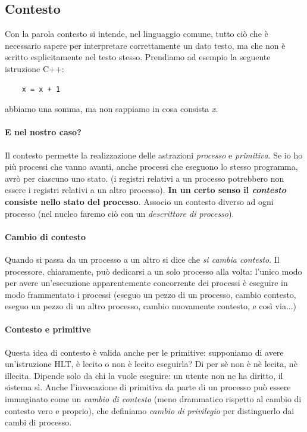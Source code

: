 \subsection{Contesto}
Con la parola contesto si intende, nel linguaggio comune, tutto ciò che è necessario sapere per interpretare correttamente un dato testo, ma che non è scritto esplicitamente nel testo stesso. Prendiamo ad esempio la seguente istruzione C++:
\begin{verbatim}
	x = x + 1
\end{verbatim}
abbiamo una somma, ma non sappiamo in cosa consista \emph{x}.

\paragraph{E nel nostro caso?} Il contesto permette la realizzazione delle astrazioni \emph{processo} e \emph{primitiva}. Se io ho più processi che vanno avanti, anche processi che eseguono lo stesso programma, avrò per ciascuno uno stato. (i registri relativi a un processo potrebbero non essere i registri relativi a un altro processo). \textbf{In un certo senso il \emph{contesto} consiste nello stato del processo}. Associo un contesto diverso ad ogni processo (nel nucleo faremo ciò con un \emph{descrittore di processo}).
\paragraph{Cambio di contesto}
Quando si passa da un processo a un altro si dice che \emph{si cambia contesto}. Il processore, chiaramente, può dedicarsi a un solo processo alla volta: l'unico modo per avere un'esecuzione apparentemente concorrente dei processi è eseguire in modo frammentato i processi (eseguo un pezzo di un processo, cambio contesto, eseguo un pezzo di un altro processo, cambio nuovamente contesto, e così via...)
\paragraph{Contesto e primitive}
Questa idea di contesto è valida anche per le primitive: supponiamo di avere un'istruzione HLT, è lecito o non è lecito eseguirla? Di per sè non è nè lecita, nè illecita. Dipende solo da chi la vuole eseguire: un utente non ne ha diritto, il sistema sì. Anche l'invocazione di primitiva da parte di un processo può essere immaginato come un \emph{cambio di contesto} (meno drammatico rispetto al cambio di contesto vero e proprio), che definiamo \emph{cambio di privilegio} per distinguerlo dai cambi di processo.

